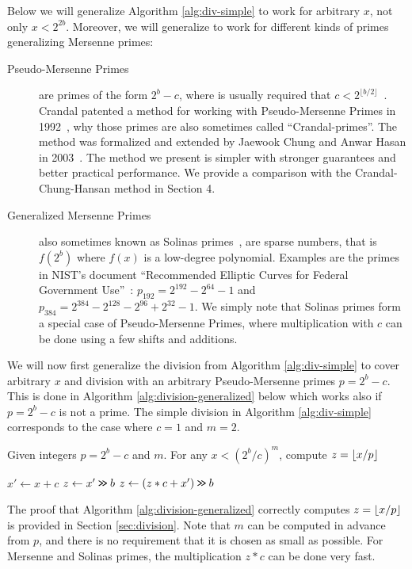 Below we will generalize Algorithm \ref{alg:div-simple} to work for
arbitrary $x$, not only $x<2^{2b}$. Moreover, we will generalize
to work for different kinds of primes generalizing Mersenne primes:
\begin{description}
	\item[Pseudo-Mersenne Primes]
	      are primes of the form $2^b-c$, where is usually required that $c < 2^{\lfloor b/2\rfloor}$~\cite{van2014encyclopedia}.
	      Crandal patented a method for working with Pseudo-Mersenne Primes in 1992~\cite{crandall1992method},
	      why those primes are also sometimes called ``Crandal-primes''.
	      The method was formalized and extended by Jaewook Chung and Anwar Hasan in 2003~\cite{chung2003more}. The method we present is simpler with
	      stronger guarantees and better practical performance.
	      We provide a comparison with the Crandal-Chung-Hansan method in Section 4.
	\item[Generalized Mersenne Primes]
	      also sometimes known as Solinas primes~\cite{Solinas2011}, are sparse numbers, that is $f(2^b)$ where $f(x)$ is a low-degree polynomial.
	      Examples are the primes in NIST's document ``Recommended Elliptic Curves for Federal Government Use''~\cite{nist}:
	      $p_{192} = 2^{192} - 2^{64} - 1$
	      and
	      $p_{384} = 2^{384}-2^{128}-2^{96}+2^{32}-1$.
	      We simply note that Solinas primes form a special case of
	      Pseudo-Mersenne Primes, where multiplication with $c$
	      can be done using a few shifts and additions.
\end{description}
We will now first generalize the division from Algorithm \ref{alg:div-simple} to cover arbitrary $x$ and division with an arbitrary Pseudo-Mersenne primes $p=2^b-c$.
This is done in Algorithm \ref{alg:division-generalized} below which
works also if $p=2^b-c$ is not a prime.  The
simple division in Algorithm \ref{alg:div-simple} corresponds to the case
where $c=1$ and $m=2$.
\begin{algorithm}[H]
	\caption{Given integers $p=2^b-c$ and $m$.
		For any $x< (2^b/c)^m$, compute $z=\lfloor {x/p} \rfloor$}
	\label{alg:division-generalized}
	\begin{algorithmic}
		\State $x' \gets x + c$
		\State $z \gets x' \mathbin{\texttt{>\!>}} b$
		\State $z \gets (z * c + x')\mathbin{\texttt{>\!>}} b$
		\EndFor
	\end{algorithmic}
\end{algorithm}
The proof that Algorithm \ref{alg:division-generalized} correctly computes
$z=\lfloor {x/p} \rfloor$ is provided in Section \ref{sec:division}.
Note that $m$ can be computed in advance from $p$, and there is no requirement that it is chosen as small as possible.
For Mersenne and Solinas primes, the multiplication $z*c$ can be done very fast.

